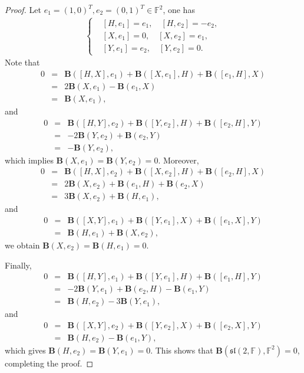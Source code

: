 \documentclass[reqno]{amsart}
\theoremstyle{definition}
\begin{document}
\begin{proof}
Let $e_{1}=(1,0)^{T},e_{2}=(0,1)^{T}\in \mathbb{F}^{2}$, one has
\begin{eqnarray*}
\left\{
\begin{aligned}
&[H,e_{1}]=e_{1},\quad  [H,e_{2}]=-e_{2},\\
&[X,e_{1}]=0,\quad [X,e_{2}]=e_{1},\\
&[Y,e_{1}]=e_{2},\quad [Y,e_{2}]=0.
\end{aligned}
\right.
\end{eqnarray*}
Note that
\begin{eqnarray*}
0&=&\mathbf{B}([H,X],e_{1})+\mathbf{B}([X,e_{1}],H)+\mathbf{B}([e_{1},H],X)\\
 &=&2\mathbf{B}(X,e_{1})-\mathbf{B}(e_{1},X)\\
 &=& \mathbf{B}(X,e_{1}),
\end{eqnarray*}
and
\begin{eqnarray*}
0&=& \mathbf{B}([H,Y],e_{2})+\mathbf{B}([Y,e_{2}],H)+\mathbf{B}([e_{2},H],Y)\\
 &=& -2\mathbf{B}(Y,e_{2})+\mathbf{B}(e_{2},Y)\\
 &=& -\mathbf{B}(Y,e_{2}),
\end{eqnarray*}
which implies  $\mathbf{B}(X,e_{1})=\mathbf{B}(Y,e_{2})=0.$
Moreover,
\begin{eqnarray*}
0&=&\mathbf{B}([H,X],e_{2})+\mathbf{B}([X,e_{2}],H)+\mathbf{B}([e_{2},H],X)\\
 &=& 2\mathbf{B}(X,e_{2})+\mathbf{B}(e_{1},H)+\mathbf{B}(e_{2},X)\\
 &=& 3\mathbf{B}(X,e_{2})+\mathbf{B}(H,e_{1}),
\end{eqnarray*}
and
\begin{eqnarray*}
0&=& \mathbf{B}([X,Y],e_{1})+\mathbf{B}([Y,e_{1}],X)+\mathbf{B}([e_{1},X],Y)\\
 &=& \mathbf{B}(H,e_{1})+\mathbf{B}(X,e_{2}),
\end{eqnarray*}
we obtain $\mathbf{B}(X,e_{2})=\mathbf{B}(H,e_{1})=0$.

Finally,
\begin{eqnarray*}
0&=& \mathbf{B}([H,Y],e_{1})+\mathbf{B}([Y,e_{1}],H)+\mathbf{B}([e_{1},H],Y)\\
 &=& -2\mathbf{B}(Y,e_{1})+\mathbf{B}(e_{2},H)-\mathbf{B}(e_{1},Y)\\
 &=& \mathbf{B}(H,e_{2})-3\mathbf{B}(Y,e_{1}),
\end{eqnarray*}
and
\begin{eqnarray*}
0&=& \mathbf{B}([X,Y],e_{2})+\mathbf{B}([Y,e_{2}],X)+\mathbf{B}([e_{2},X],Y)\\
 &=& \mathbf{B}(H,e_{2})-\mathbf{B}(e_{1},Y),
\end{eqnarray*}
which gives $\mathbf{B}(H,e_{2})=\mathbf{B}(Y,e_{1})=0$. This shows that $\mathbf{B}(\mathfrak{sl}(2,\mathbb{F}),\mathbb{F}^{2})=0$, completing the proof.
\end{proof}
\end{document}
